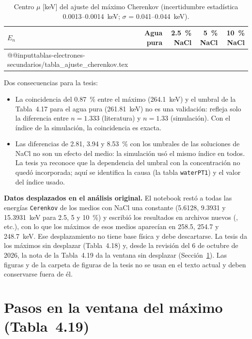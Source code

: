 \documentclass[11pt,a4paper]{article}
\newcommand{\tablas}{tablas-electrones-secundarios}
\newcommand{\var}[1]{\texttt{#1}}
\begin{document}
\begin{table}[H]
\centering\small
\caption{Centro $\mu$ [keV] del ajuste del máximo Cherenkov (incertidumbre estadística 0.0013--0.0014~keV; $\sigma$ = 0.041--0.044~keV).}
\label{tab:ajuste}
\begin{tabular}{@{}lrrrr@{}}
\toprule
$E_n$ & Agua pura & 2.5~\% NaCl & 5~\% NaCl & 10~\% NaCl \\
\midrule
\csname @@input\endcsname \tablas/tabla_ajuste_cherenkov.tex
\bottomrule
\end{tabular}
\end{table}

Dos consecuencias para la tesis:
\begin{itemize}
  \item La coincidencia del 0.87~\% entre el máximo (264.1~keV) y el umbral de la Tabla~4.17 para el agua pura (261.81~keV) no es una validación: refleja solo la diferencia entre $n=1.333$ (literatura) y $n=1.33$ (simulación). Con el índice de la simulación, la coincidencia es exacta.
  \item Las diferencias de 2.81, 3.94 y 8.53~\% con los umbrales de las soluciones de NaCl no son un efecto del medio: la simulación usó el mismo índice en todos. La tesis ya reconoce que la dependencia del umbral con la concentración no quedó incorporada; aquí se identifica la causa (la tabla \var{waterPT1}) y el valor del índice usado.
\end{itemize}

\textbf{Datos desplazados en el análisis original.} El notebook  restó a todas las energías \var{Cerenkov} de los medios con NaCl una constante (5.6128, 9.3931 y 15.3931~keV para 2.5, 5 y 10~\%) y escribió los resultados en archivos nuevos (, etc.), con lo que los máximos de esos medios aparecían en 258.5, 254.7 y 248.7~keV. Ese desplazamiento no tiene base física y debe descartarse. La tesis da los máximos sin desplazar (Tabla~4.18) y, desde la revisión del 6 de octubre de 2026, la nota de la Tabla~4.19 da la ventana sin desplazar (Sección~\ref{sec:ventana}). Las figuras  y  de la carpeta de figuras de la tesis no se usan en el texto actual y deben conservarse fuera de él.

\section{Pasos en la ventana del máximo (Tabla~4.19)}
\label{sec:ventana}
\end{document}
